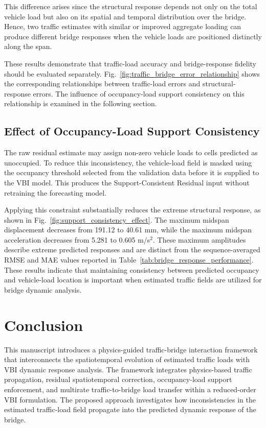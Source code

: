 \documentclass[journal]{IEEEtran}
\begin{document}
This difference arises since the structural response depends not only on the total vehicle load but also on its spatial and temporal distribution over the bridge. Hence, two traffic estimates with similar or improved aggregate loading can produce different bridge responses when the vehicle loads are positioned distinctly along the span.

These results demonstrate that traffic-load accuracy and bridge-response fidelity should be evaluated separately. Fig.~\ref{fig:traffic_bridge_error_relationship} shows the corresponding relationships between traffic-load errors and structural-response errors. The influence of occupancy-load support consistency on this relationship is examined in the following section.

\subsection{Effect of Occupancy-Load Support Consistency}
\label{sec:support_consistency_results}

The raw residual estimate may assign non-zero vehicle loads to cells predicted as unoccupied. To reduce this inconsistency, the vehicle-load field is masked using the occupancy threshold selected from the validation data before it is supplied to the VBI model. This produces the Support-Consistent Residual input without retraining the forecasting model.

Applying this constraint substantially reduces the extreme structural response, as shown in Fig.~\ref{fig:support_consistency_effect}. The maximum midspan displacement decreases from 191.12 to 40.61 mm, while the maximum midspan acceleration decreases from 5.281 to 0.605 m/s$^2$. These maximum amplitudes describe extreme predicted responses and are distinct from the sequence-averaged RMSE and MAE values reported in Table~\ref{tab:bridge_response_performance}. These results indicate that maintaining consistency between predicted occupancy and vehicle-load location is important when estimated traffic fields are utilized for bridge dynamic analysis.

\FloatBarrier

\section{Conclusion}

This manuscript introduces a physics-guided traffic-bridge interaction framework that interconnects the spatiotemporal evolution of estimated traffic loads with VBI dynamic response analysis. The framework integrates physics-based traffic propagation, residual spatiotemporal correction, occupancy-load support enforcement, and multirate traffic-to-bridge load transfer within a reduced-order VBI formulation. The proposed approach investigates how inconsistencies in the estimated traffic-load field propagate into the predicted dynamic response of the bridge.
\end{document}

